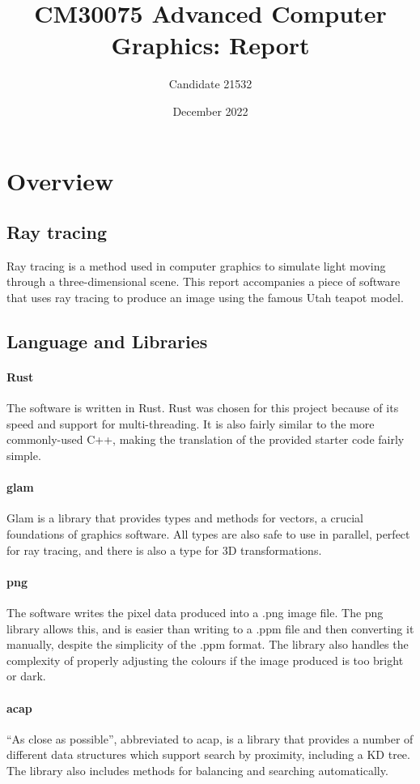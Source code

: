\documentclass[a4paper]{article}
\title{CM30075 Advanced Computer Graphics: Report}
\author{Candidate 21532}
\date{December 2022}
\begin{document}
\maketitle
\tableofcontents
\pagebreak

\section{Overview}
\subsection{Ray tracing}
Ray tracing is a method used in computer graphics to simulate light moving through a three-dimensional scene. This report accompanies a piece of software that uses ray tracing to produce an image using the famous Utah teapot model.

\subsection{Language and Libraries}
\paragraph{Rust} The software is written in Rust. Rust was chosen for this project because of its speed and support for multi-threading. It is also fairly similar to the more commonly-used C++, making the translation of the provided starter code fairly simple.

\paragraph{glam} Glam is a library that provides types and methods for vectors, a crucial foundations of graphics software. All types are also safe to use in parallel, perfect for ray tracing, and there is also a type for 3D transformations.

\paragraph{png} The software writes the pixel data produced into a .png image file. The png library allows this, and is easier than writing to a .ppm file and then converting it manually, despite the simplicity of the .ppm format. The library also handles the complexity of properly adjusting the colours if the image produced is too bright or dark.

\paragraph{acap} ``As close as possible'', abbreviated to acap, is a library that provides a number of different data structures which support search by proximity, including a KD tree. The library also includes methods for balancing and searching automatically.
\end{document}
